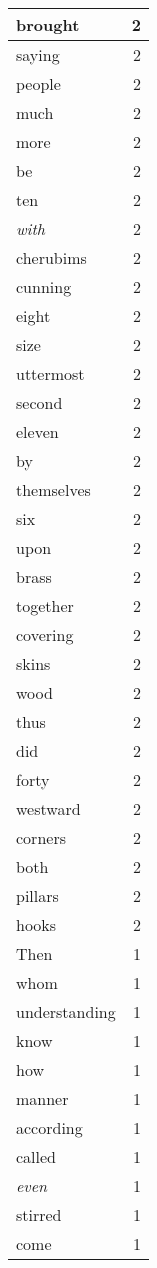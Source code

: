 \begin{center}
\begin{longtable}{l|r}
brought & 2 \\ \hline
saying & 2 \\ \hline
people & 2 \\ \hline
much & 2 \\ \hline
more & 2 \\ \hline
be & 2 \\ \hline
ten & 2 \\ \hline
\emph{with} & 2 \\ \hline
cherubims & 2 \\ \hline
cunning & 2 \\ \hline
eight & 2 \\ \hline
size & 2 \\ \hline
uttermost & 2 \\ \hline
second & 2 \\ \hline
eleven & 2 \\ \hline
by & 2 \\ \hline
themselves & 2 \\ \hline
six & 2 \\ \hline
upon & 2 \\ \hline
brass & 2 \\ \hline
together & 2 \\ \hline
covering & 2 \\ \hline
skins & 2 \\ \hline
wood & 2 \\ \hline
thus & 2 \\ \hline
did & 2 \\ \hline
forty & 2 \\ \hline
westward & 2 \\ \hline
corners & 2 \\ \hline
both & 2 \\ \hline
pillars & 2 \\ \hline
hooks & 2 \\ \hline
Then & 1 \\ \hline
whom & 1 \\ \hline
understanding & 1 \\ \hline
know & 1 \\ \hline
how & 1 \\ \hline
manner & 1 \\ \hline
according & 1 \\ \hline
called & 1 \\ \hline
\emph{even} & 1 \\ \hline
stirred & 1 \\ \hline
come & 1 \\ \hline

\end{longtable}
\end{center}
